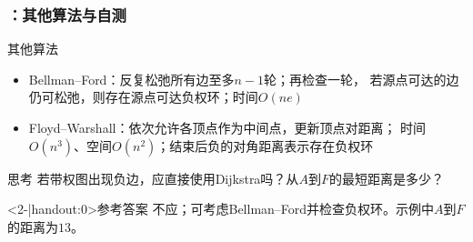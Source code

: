 \begin{frame}
    \frametitle{\insertsectionhead：其他算法与自测}
    \begin{block}{其他算法}
        \begin{itemize}
            \item Bellman--Ford：反复松弛所有边至多$n-1$轮；再检查一轮，
                  若源点可达的边仍可松弛，则存在源点可达负权环；时间$O(ne)$
            \item Floyd--Warshall：依次允许各顶点作为中间点，更新顶点对距离；
                  时间$O(n^3)$、空间$O(n^2)$；结束后负的对角距离表示存在负权环
        \end{itemize}
    \end{block}
    \begin{alertblock}{思考}
        若带权图出现负边，应直接使用Dijkstra吗？从$A$到$F$的最短距离是多少？
    \end{alertblock}
    \begin{block}<2-|handout:0>{参考答案}
        不应；可考虑Bellman--Ford并检查负权环。示例中$A$到$F$的距离为$13$。
    \end{block}
\end{frame}
